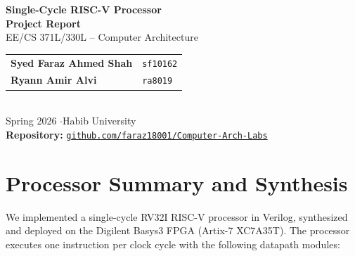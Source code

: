 \documentclass[11pt,a4paper]{article}
\begin{document}
\begin{center}
    {\LARGE\bfseries\color{accent} Single-Cycle RISC-V Processor\\[0.2em] Project Report}\\[1em]
    {\large EE/CS 371L/330L -- Computer Architecture}\\[0.8em]
    \begin{tabular}{ll}
        \textbf{Syed Faraz Ahmed Shah} & \texttt{sf10162} \\
        \textbf{Ryann Amir Alvi} & \texttt{ra8019} \\
    \end{tabular}\\[0.4em]
    {\color{codegray}\small Spring 2026 \quad$\cdot$\quad Habib University}\\[0.4em]
    {\small\textbf{Repository:} \href{https://github.com/faraz18001/Computer-Arch-Labs.git}{\texttt{github.com/faraz18001/Computer-Arch-Labs}}}
\end{center}

\vspace{0.5em}

\section{Processor Summary and Synthesis}

We implemented a single-cycle RV32I RISC-V processor in Verilog, synthesized and deployed on the Digilent Basys3 FPGA (Artix-7 XC7A35T). The processor executes one instruction per clock cycle with the following datapath modules:
\end{document}
